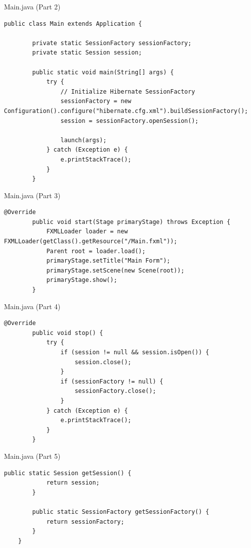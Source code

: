 \documentclass[aspectratio=169, table]{beamer}
\begin{document}
\begin{frame}[fragile]{Main.java (Part 2)}
\vspace{20pt}
\begin{lstlisting}[style=JavaStyle]
	public class Main extends Application {
		
		private static SessionFactory sessionFactory;
		private static Session session;
		
		public static void main(String[] args) {
			try {
				// Initialize Hibernate SessionFactory
				sessionFactory = new Configuration().configure("hibernate.cfg.xml").buildSessionFactory();
				session = sessionFactory.openSession();
				
				launch(args);
			} catch (Exception e) {
				e.printStackTrace();
			}
		}
	\end{lstlisting}
\end{frame}

\begin{frame}[fragile]{Main.java (Part 3)}
	\vspace{20pt}
	\begin{lstlisting}[style=JavaStyle]
		@Override
		public void start(Stage primaryStage) throws Exception {
			FXMLLoader loader = new FXMLLoader(getClass().getResource("/Main.fxml"));
			Parent root = loader.load();
			primaryStage.setTitle("Main Form");
			primaryStage.setScene(new Scene(root));
			primaryStage.show();
		}
	\end{lstlisting}
\end{frame}

\begin{frame}[fragile]{Main.java (Part 4)}
	\vspace{20pt}
	\begin{lstlisting}[style=JavaStyle]
		@Override
		public void stop() {
			try {
				if (session != null && session.isOpen()) {
					session.close();
				}
				if (sessionFactory != null) {
					sessionFactory.close();
				}
			} catch (Exception e) {
				e.printStackTrace();
			}
		}
	\end{lstlisting}
\end{frame}

\begin{frame}[fragile]{Main.java (Part 5)}
	\vspace{20pt}
	\begin{lstlisting}[style=JavaStyle]
		public static Session getSession() {
			return session;
		}
		
		public static SessionFactory getSessionFactory() {
			return sessionFactory;
		}
	}
\end{lstlisting}
\end{frame}
\end{document}
